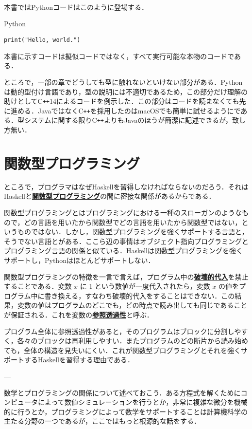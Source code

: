 \documentclass[a4paper,twocolumn]{jsbook}
\newcommand{\programminglanguage}[1]{\textsf{#1}}
\newcommand{\cxx}{\programminglanguage{C}\texttt{++}}
\newcommand{\cxxfourteen}{\cxx\programminglanguage{14}}
\newcommand{\haskell}{\programminglanguage{Haskell}}
\newcommand{\java}{\programminglanguage{Java}}
\newcommand{\python}{\programminglanguage{Python}}
\newcommand{\keyword}[1]{{\underline{\textbf{#1}}}}
\newenvironment{pythoncode}{\begin{itembox}[r]{\python}}{\end{itembox}}
\begin{document}
本書では\python コードはこのように登場する．
\begin{pythoncode}
\begin{verbatim}
print("Hello, world.")
\end{verbatim}
\end{pythoncode}
本書に示すコードは擬似コードではなく，すべて実行可能な本物のコードである．

ところで，一部の章でどうしても型に触れないといけない部分がある．\python は動的型付け言語であり，型の説明には不適切であるため，この部分だけ理解の助けとして\cxxfourteen によるコードを例示した．この部分はコードを読まなくても先に進める．\java ではなく\cxx を採用したのはmacOSでも簡単に試せるようにである．型システムに関する限り\cxx よりも\java のほうが簡潔に記述できるが，致し方無い．

\section{関数型プログラミング}

ところで，プログラマはなぜ\haskell を習得しなければならないのだろう．それは\haskell と\keyword{関数型プログラミング}の間に密接な関係があるからである．

関数型プログラミングとはプログラミングにおける一種のスローガンのようなもので，どの言語を用いたから関数型でどの言語を用いたから関数型ではない，というものではない．しかし，関数型プログラミングを強くサポートする言語と，そうでない言語とがある．ここら辺の事情はオブジェクト指向プログラミングとプログラミング言語の関係と似ている．\haskell は関数型プログラミングを強くサポートし，\python はほとんどサポートしない．

関数型プログラミングの特徴を一言で言えば，プログラム中の\keyword{破壊的代入}を禁止することである．変数 $x$ に $1$ という数値が一度代入されたら，変数 $x$ の値をプログラム中に書き換える，すなわち破壊的代入をすることはできない．この結果，変数の値はプログラムのどこでも，どの時点で読み出しても同じであることが保証される．これを変数の\keyword{参照透過性}と呼ぶ．

プログラム全体に参照透過性があると，そのプログラムはブロックに分割しやすく，各々のブロックは再利用しやすい．またプログラムのどの断片から読み始めても，全体の構造を見失いにくい．これが関数型プログラミングとそれを強くサポートする\haskell を習得する理由である．

---

数学とプログラミングの関係について述べておこう．ある方程式を解くためにコンピュータによって数値シミュレーションを行うとか，非常に複雑な微分を機械的に行うとか，プログラミングによって数学をサポートすることは計算機科学の主たる分野の一つであるが，ここではもっと根源的な話をする．
\end{document}
